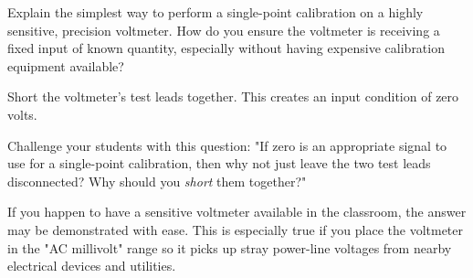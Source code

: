

Explain the simplest way to perform a single-point calibration on a highly sensitive, precision voltmeter.  How do you ensure the voltmeter is receiving a fixed input of known quantity, especially without having expensive calibration equipment available?







Short the voltmeter's test leads together.  This creates an input condition of zero volts.







Challenge your students with this question: "If zero is an appropriate signal to use for a single-point calibration, then why not just leave the two test leads disconnected?  Why should you {\it short} them together?"

If you happen to have a sensitive voltmeter available in the classroom, the answer may be demonstrated with ease.  This is especially true if you place the voltmeter in the "AC millivolt" range so it picks up stray power-line voltages from nearby electrical devices and utilities.



